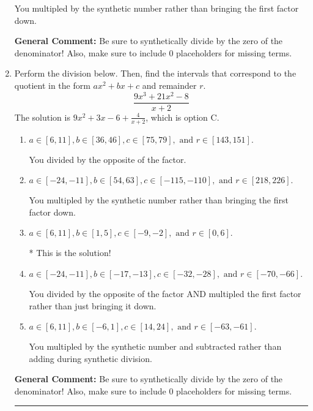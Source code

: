 \documentclass{extbook}[14pt]
\newcommand{\litem}[1]{\item #1

\rule{\textwidth}{0.4pt}}
\begin{document}
\begin{enumerate}
{\begin{enumerate}[label=\Alph*.]
 You multipled by the synthetic number rather than bringing the first factor down.
\end{enumerate}

\textbf{General Comment:} Be sure to synthetically divide by the zero of the denominator! Also, make sure to include 0 placeholders for missing terms.
}
\litem{
Perform the division below. Then, find the intervals that correspond to the quotient in the form $ax^2+bx+c$ and remainder $r$.
\[ \frac{9x^{3} +21 x^{2} -8}{x + 2} \]The solution is \( 9x^{2} +3 x -6 + \frac{4}{x + 2} \), which is option C.\begin{enumerate}[label=\Alph*.]
\item \( a \in [6, 11], b \in [36, 46], c \in [75, 79], \text{ and } r \in [143, 151]. \)

 You divided by the opposite of the factor.
\item \( a \in [-24, -11], b \in [54, 63], c \in [-115, -110], \text{ and } r \in [218, 226]. \)

 You multipled by the synthetic number rather than bringing the first factor down.
\item \( a \in [6, 11], b \in [1, 5], c \in [-9, -2], \text{ and } r \in [0, 6]. \)

* This is the solution!
\item \( a \in [-24, -11], b \in [-17, -13], c \in [-32, -28], \text{ and } r \in [-70, -66]. \)

 You divided by the opposite of the factor AND multipled the first factor rather than just bringing it down.
\item \( a \in [6, 11], b \in [-6, 1], c \in [14, 24], \text{ and } r \in [-63, -61]. \)

 You multipled by the synthetic number and subtracted rather than adding during synthetic division.
\end{enumerate}

\textbf{General Comment:} Be sure to synthetically divide by the zero of the denominator! Also, make sure to include 0 placeholders for missing terms.
}
\end{enumerate}
\end{document}
